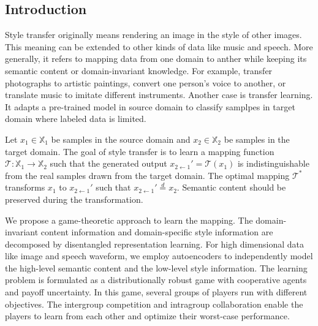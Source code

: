 \documentclass{article}
\begin{document}
\subsection{Introduction}
Style transfer originally means rendering an image in the style of other images. This meaning can be extended to other kinds of data like music and speech. More generally, it refers to mapping data from one domain to anther while keeping its semantic content or domain-invariant knowledge. For example, transfer photographs to artistic paintings, convert one person's voice to another, or translate music to imitate different instruments. Another case is transfer learning. It adapts a pre-trained model in source domain to classify samplpes in target domain where labeled data is limited.

Let $x_1 \in \mathbb{X}_1$ be samples in the source domain and $x_2 \in \mathbb{X}_2$ be samples in the target domain. The goal of style transfer is to learn a mapping function $\mathcal{T}: \mathbb{X}_1 \rightarrow \mathbb{X}_2$ such that the generated output $x_{2\leftarrow1}' = \mathcal{T}(x_1)$ is indistinguishable from the real samples drawn from the target domain. The optimal mapping $\mathcal{T}^*$ transforms $x_1$ to $x_{2\leftarrow1}'$ such that $x_{2\leftarrow1}' \overset{d}{=} x_2$. Semantic content should be preserved during the transformation.

We propose a game-theoretic approach to learn the mapping. The domain-invariant content information and domain-specific style information are decomposed by disentangled representation learning. For high dimensional data like image and speech waveform, we employ autoencoders to independently model the high-level semantic content and the low-level style information. The learning problem is formulated as a distributionally robust game with cooperative agents and payoff uncertainty. In this game, several groups of players run with different objectives. The intergroup competition and intragroup collaboration enable the players to learn from each other and optimize their worst-case performance.
\end{document}
